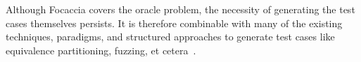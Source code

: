 Although Focaccia covers the oracle problem, the necessity of generating the test cases themselves persists. It is
therefore combinable with many of the existing techniques, paradigms, and structured approaches to generate test
cases like equivalence partitioning, fuzzing, et cetera~\cite{jan2016innovative, yu2011robust_planning}.

